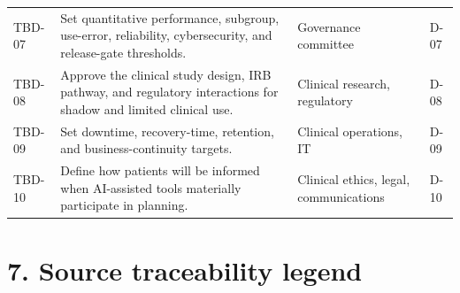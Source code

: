 \documentclass[11pt,letterpaper]{article}
\begin{document}
\begin{small}
\begin{longtable}{@{}L{0.0885\textwidth}L{0.5111\textwidth}L{0.2261\textwidth}L{0.0944\textwidth}@{}}
\addlinespace[2pt]
TBD-07 & Set quantitative performance, subgroup, use-error, reliability, cybersecurity, and release-gate thresholds. & Governance committee & D-07 \\
\addlinespace[2pt]
TBD-08 & Approve the clinical study design, IRB pathway, and regulatory interactions for shadow and limited clinical use. & Clinical research, regulatory & D-08 \\
\addlinespace[2pt]
TBD-09 & Set downtime, recovery-time, retention, and business-continuity targets. & Clinical operations, IT & D-09 \\
\addlinespace[2pt]
TBD-10 & Define how patients will be informed when AI-assisted tools materially participate in planning. & Clinical ethics, legal, communications & D-10 \\
\end{longtable}
\end{small}

\section{7. Source traceability legend}
\end{document}
